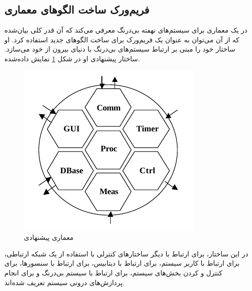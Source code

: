 \subsection{فریم‌ورک ساخت الگوهای معماری}
\label{ZalewskiFramework}
\begin{RTL}
 در \cite{ref2}
یک معماری برای سیستم‌های نهفته بی‌درنگ معرفی می‌کند
که آن قدر کلی بیان‌شده که از آن می‌توان به عنوان یک
فریم‌ورک برای ساخت الگوهای جدید استفاده کرد.
او ساختار خود را مبنی بر ارتباط سیستم‌های بی‌درنگ با
دنیای بیرون از خود می‌سازد. ساختار پیشنهادی او در شکل
\ref{ZalewskiFig} نمایش داده‌شده. 
\end{RTL}
\begin{figure}[h!]
\centering
\includegraphics[]{images/zelawski-architecture.png}
\caption{معماری پیشنهادی  \cite{ref2}}
\label{ZalewskiFig}
\end{figure}
\begin{RTL}
در این ساختار،  برای ارتباط با دیگر
ساختارهای کنترلی با استفاده از یک شبکه ارتباطی،
 برای ارتباط با کاربر سیستم،
 برای ارتباط با دیتابیس،
 برای ارتباط با سنسورها،
 برای کنترل و کردن
بخش‌های سیستم،
 برای ارتباط با  سیستم
بی‌درنگ و  برای انجام پردازش‌های درونی سیستم
تعریف شده‌اند.
\end{RTL}